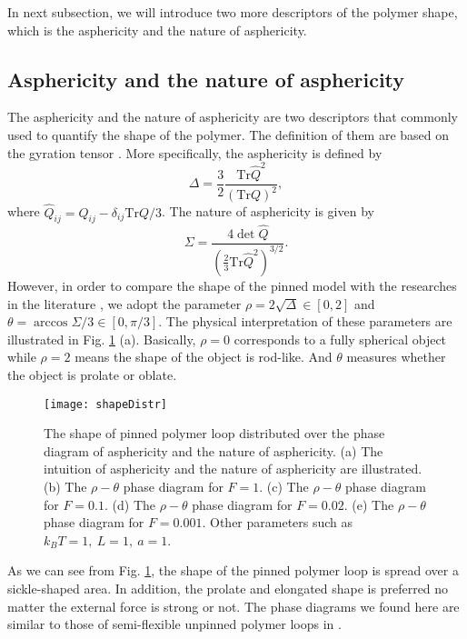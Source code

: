 In next subsection, we will introduce two more descriptors of the polymer shape, which is the asphericity and the nature of asphericity.

\subsection{Asphericity and the nature of asphericity}
\label{sub:asphericity_and_the_nature_of_asphericity}

The asphericity and the nature of asphericity are two descriptors that commonly used to quantify the shape of the polymer. The definition of them are based on the gyration tensor \cite{Alim2007}. More specifically, the asphericity is defined by
\begin{equation}
    \label{eq:asphericity}
    \Delta = \frac{3}{2} \frac{\text{Tr}\hat{Q}^2}{(\text{Tr}Q)^2},
\end{equation}
where $\hat{Q}_{ij} = Q_{ij} - \delta_{ij}\text{Tr}Q/3$. The nature of asphericity is given by
\begin{equation}
    \label{eq:natureAsphericity}
    \Sigma = \frac{4\det\hat{Q}}{\left(\frac{2}{3}\text{Tr}\hat{Q}^2\right)^{3/2}}.
\end{equation}
However, in order to compare the shape of the pinned model with the researches in the literature \cite{Alim2007,Blavatska2010a}, we adopt the parameter $\rho = 2\sqrt{\Delta} \in [0,2]$ and $\theta = \arccos\Sigma/3\in[0,\pi/3]$. The physical interpretation of these parameters are illustrated in Fig. \ref{fig:shapeDistr} (a). Basically, $\rho=0$ corresponds to a fully spherical object while $\rho=2$ means the shape of the object is rod-like. And $\theta$ measures whether the object is prolate or oblate. 

\begin{figure}[htpb]
    \centering
    \texttt{[image: shapeDistr]}
    \caption{The shape of pinned polymer loop distributed over the phase diagram of asphericity and the nature of asphericity. (a) The intuition of asphericity and the nature of asphericity are illustrated. (b) The $\rho-\theta$ phase diagram for $F=1$. (c) The $\rho-\theta$ phase diagram for $F=0.1$. (d) The $\rho-\theta$ phase diagram for $F=0.02$. (e) The $\rho-\theta$ phase diagram for $F=0.001$. Other parameters such as $k_B T =1,~L=1,~a=1$.}
    \label{fig:shapeDistr}
\end{figure}

As we can see from Fig. \ref{fig:shapeDistr}, the shape of the pinned polymer loop is spread over a sickle-shaped area. In addition, the prolate and elongated shape is preferred no matter the external force is strong or not. The phase diagrams we found here are similar to those of semi-flexible unpinned polymer loops in \cite{Alim2007}.

